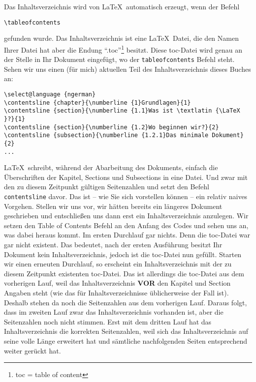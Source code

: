 Das Inhaltsverzeichnis wird von \LaTeX\ automatisch erzeugt, wenn der Befehl 
\begin{verbatim}
\tableofcontents
\end{verbatim}
gefunden wurde. Das Inhaltsverzeichnis ist eine \LaTeX\ Datei, die den Namen Ihrer Datei hat aber die Endung "`.toc"'\footnote{toc = table of content} besitzt. Diese toc-Datei wird genau an der Stelle in Ihr Dokument eingefügt, wo der \texttt{tableofcontents} Befehl steht. Sehen wir uns einen (für mich) aktuellen Teil des Inhaltsverzeichnis dieses Buches an:

\footnotesize
\begin{verbatim}
\select@language {ngerman}
\contentsline {chapter}{\numberline {1}Grundlagen}{1}
\contentsline {section}{\numberline {1.1}Was ist \textlatin {\LaTeX }?}{1}
\contentsline {section}{\numberline {1.2}Wo beginnen wir?}{2}
\contentsline {subsection}{\numberline {1.2.1}Das minimale Dokument}{2}
...
\end{verbatim}
\normalsize

\LaTeX\ schreibt, während der Abarbeitung des Dokuments, einfach die Überschriften der Kapitel, Sections und Subsections in eine Datei. Und zwar mit den zu diesem Zeitpunkt gültigen Seitenzahlen und setzt den Befehl \texttt{contentsline} davor. Das ist -- wie Sie sich vorstellen können -- ein relativ naives Vorgehen. Stellen wir uns vor, wir hätten bereits ein längeres Dokument geschrieben und entschließen uns dann erst ein Inhaltsverzeichnis anzulegen. Wir setzen den Table of Contents Befehl an den Anfang des Codes und sehen uns an, was dabei heraus kommt. Im ersten Durchlauf gar nichts. Denn die toc-Datei war gar nicht existent. Das bedeutet, nach der ersten Ausführung besitzt Ihr Dokument kein Inhaltsverzeichnis, jedoch ist die toc-Datei nun gefüllt. Starten wir einen erneuten Durchlauf, so erscheint ein Inhaltsverzeichnis mit der zu diesem Zeitpunkt existenten toc-Datei. Das ist allerdings die toc-Datei aus dem vorherigen Lauf, weil das Inhaltsverzeichnis  \textbf{VOR} den Kapitel und Section Angaben steht (wie das für Inhaltsverzeichnisse üblicherweise der Fall ist). Deshalb stehen da noch die Seitenzahlen aus dem vorherigen Lauf. Daraus folgt, dass im zweiten Lauf zwar das Inhaltsverzeichnis vorhanden ist, aber die Seitenzahlen noch nicht stimmen. Erst mit dem dritten Lauf hat das Inhaltsverzeichnis die korrekten Seitenzahlen, weil sich das Inhaltsverzeichnis auf seine volle Länge erweitert hat und sämtliche nachfolgenden Seiten entsprechend weiter gerückt hat.

